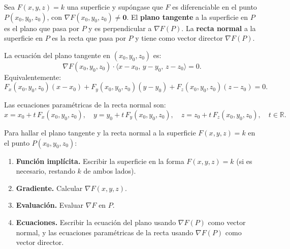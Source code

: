 \begin{definition}
Sea $F(x,y,z)=k$ una superficie y supóngase que $F$ es diferenciable en
el punto $P(x_0,y_0,z_0)$, con $\nabla F(x_0,y_0,z_0) \neq \mathbf{0}$.
El \textbf{plano tangente} a la superficie en $P$ es el plano que pasa
por $P$ y es perpendicular a $\nabla F(P)$. La \textbf{recta normal} a
la superficie en $P$ es la recta que pasa por $P$ y tiene como vector
director $\nabla F(P)$.
\end{definition}

La ecuación del plano tangente en $(x_0,y_0,z_0)$ es:
\[
\nabla F(x_0,y_0,z_0) \cdot \langle x-x_0,\, y-y_0,\, z-z_0 \rangle = 0.
\]
Equivalentemente:
\[
F_x(x_0,y_0,z_0)(x-x_0)
+ F_y(x_0,y_0,z_0)(y-y_0)
+ F_z(x_0,y_0,z_0)(z-z_0) = 0.
\]

Las ecuaciones paramétricas de la recta normal son:
\[
x = x_0 + t\,F_x(x_0,y_0,z_0),\quad
y = y_0 + t\,F_y(x_0,y_0,z_0),\quad
z = z_0 + t\,F_z(x_0,y_0,z_0),\quad t\in\mathbb{R}.
\]

\begin{pasos}
Para hallar el plano tangente y la recta normal a la superficie
$F(x,y,z)=k$ en el punto $P(x_0,y_0,z_0)$:
\begin{enumerate}
    \item \textbf{Función implícita.} Escribir la superficie en la forma
    $F(x,y,z)=k$ (si es necesario, restando $k$ de ambos lados).
    \item \textbf{Gradiente.} Calcular $\nabla F(x,y,z)$.
    \item \textbf{Evaluación.} Evaluar $\nabla F$ en $P$.
    \item \textbf{Ecuaciones.} Escribir la ecuación del plano usando
    $\nabla F(P)$ como vector normal, y las ecuaciones paramétricas de la
    recta usando $\nabla F(P)$ como vector director.
\end{enumerate}
\end{pasos}

